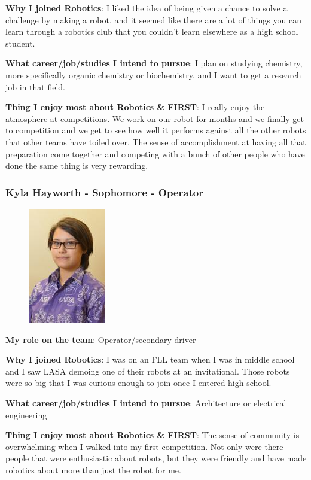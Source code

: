 {\bf Why I joined Robotics}: I liked the idea of being given a chance to solve a challenge by making a robot, and it seemed like there are a lot of things you can learn through a robotics club that you couldn't learn elsewhere as a high school student.

{\bf What career/job/studies I intend to pursue}: I plan on studying chemistry, more specifically organic chemistry or biochemistry, and I want to get a research job in that field.

{\bf Thing I enjoy most about Robotics \& FIRST}: I really enjoy the atmosphere at competitions. We work on our robot for months and we finally get to competition and we get to see how well it performs against all the other robots that other teams have toiled over. The sense of accomplishment at having all that preparation come together and competing with a bunch of other people who have done the same thing is very rewarding.

\subsubsection{Kyla Hayworth - Sophomore - Operator} 
\begin{figure}[H]
	\includegraphics[width=0.2\linewidth]{kyla}
\end{figure}
{\bf My role on the team}: Operator/secondary driver

{\bf Why I joined Robotics}: I was on an FLL team when I was in middle school and I saw LASA demoing one of their robots at an invitational. Those robots were so big that I was curious enough to join once I entered high school.

{\bf What career/job/studies I intend to pursue}: Architecture or electrical engineering

{\bf Thing I enjoy most about Robotics \& FIRST}: The sense of community is overwhelming when I walked into my first competition. Not only were there people that were enthusiastic about robots, but they were friendly and have made robotics about more than just the robot for me. 

